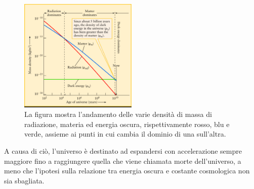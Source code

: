 \begin{figure}
    \centering
    \includegraphics[width = 0.5\textwidth]{immagini/epoche-universo.png}
    \caption{La figura mostra l'andamento delle varie densità di massa di radiazione, materia ed energia oscura, rispettivamente rosso, blu e verde, assieme ai punti in cui cambia il dominio di una sull'altra.}\label{fig:epoche}
\end{figure}

A causa di ciò, l'universo è destinato ad espandersi con accelerazione sempre maggiore fino a raggiungere quella che viene chiamata morte dell'universo, a meno che l'ipotesi sulla relazione tra energia oscura e costante cosmologica non sia sbagliata.